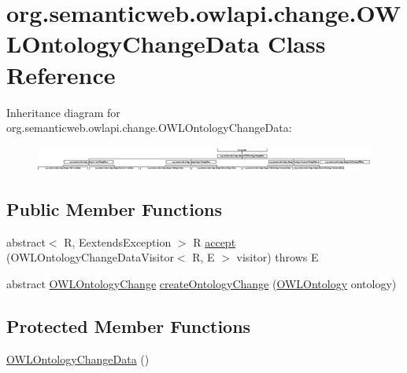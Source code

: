 \hypertarget{classorg_1_1semanticweb_1_1owlapi_1_1change_1_1_o_w_l_ontology_change_data}{\section{org.\-semanticweb.\-owlapi.\-change.\-O\-W\-L\-Ontology\-Change\-Data Class Reference}
\label{classorg_1_1semanticweb_1_1owlapi_1_1change_1_1_o_w_l_ontology_change_data}
}
Inheritance diagram for org.\-semanticweb.\-owlapi.\-change.\-O\-W\-L\-Ontology\-Change\-Data\-:\begin{figure}[H]
\begin{center}
\leavevmode
\includegraphics[height=0.826873cm]{classorg_1_1semanticweb_1_1owlapi_1_1change_1_1_o_w_l_ontology_change_data}
\end{center}
\end{figure}
\subsection*{Public Member Functions}
\begin{DoxyCompactItemize}
\item 
abstract$<$ R, Eextends\-Exception $>$ R \hyperlink{classorg_1_1semanticweb_1_1owlapi_1_1change_1_1_o_w_l_ontology_change_data_a5a42c38a311aa83a36d790e64a271794}{accept} (O\-W\-L\-Ontology\-Change\-Data\-Visitor$<$ R, E $>$ visitor)  throws E
\item 
abstract \hyperlink{classorg_1_1semanticweb_1_1owlapi_1_1model_1_1_o_w_l_ontology_change}{O\-W\-L\-Ontology\-Change} \hyperlink{classorg_1_1semanticweb_1_1owlapi_1_1change_1_1_o_w_l_ontology_change_data_a956fe4863fc8b4ac9da1fcfac982579a}{create\-Ontology\-Change} (\hyperlink{interfaceorg_1_1semanticweb_1_1owlapi_1_1model_1_1_o_w_l_ontology}{O\-W\-L\-Ontology} ontology)
\end{DoxyCompactItemize}
\subsection*{Protected Member Functions}
\begin{DoxyCompactItemize}
\item 
\hyperlink{classorg_1_1semanticweb_1_1owlapi_1_1change_1_1_o_w_l_ontology_change_data_a335636c87797d6a63fc2ba6776c6ae28}{O\-W\-L\-Ontology\-Change\-Data} ()
\end{DoxyCompactItemize}
